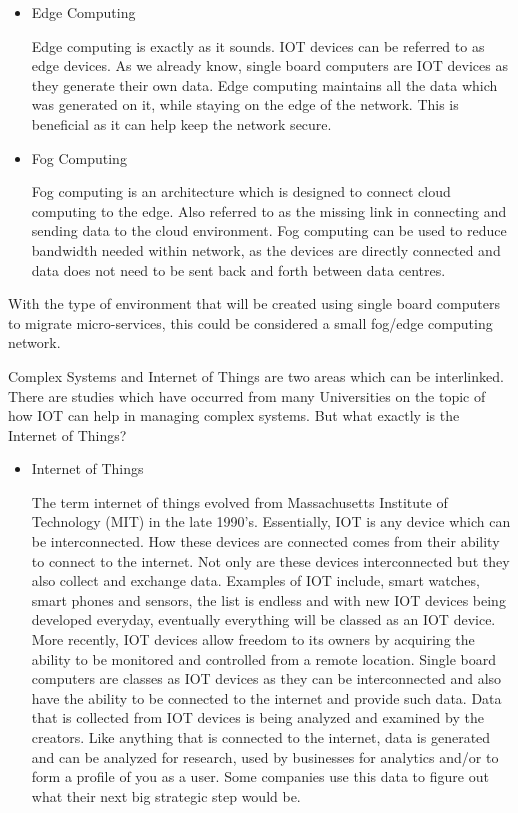 \begin{itemize}
    \item Edge Computing
    
    Edge computing is exactly as it sounds. IOT devices can be referred to as edge devices. As we already know, single board computers are IOT devices as they generate their own data. Edge computing maintains all the data which was generated on it, while staying on the edge of the network. This is beneficial as it can help keep the network secure. 
    
    \item Fog Computing
    
    Fog computing is an architecture which is designed to connect cloud computing to the edge. Also referred to as the missing link in connecting and sending data to the cloud environment. Fog computing can be used to reduce bandwidth needed within network, as the devices are directly connected and data does not need to be sent back and forth between data centres. 
    
    
\end{itemize}

With the type of environment that will be created using single board computers to migrate micro-services, this could be considered a small fog/edge computing network. 

Complex Systems and Internet of Things are two areas which can be interlinked. There are studies which have occurred from many Universities on the topic of how IOT can help in managing complex systems. But what exactly is the Internet of Things? 

\begin{itemize}
    \item Internet of Things 
    
    The term internet of things evolved from Massachusetts Institute of Technology (MIT) in the late 1990's. Essentially, IOT is any device which can be interconnected. How these devices are connected comes from their ability to connect to the internet. Not only are these devices interconnected but they also collect and exchange data. Examples of IOT include, smart watches, smart phones and sensors, the list is endless and with new IOT devices being developed everyday, eventually everything will be classed as an IOT device. More recently, IOT devices allow freedom to its owners by acquiring the ability to be monitored and controlled from a remote location. Single board computers are classes as IOT devices as they can be interconnected and also have the ability to be connected to the internet and provide such data. 
    Data that is collected from IOT devices is being analyzed and examined by the creators. Like anything that is connected to the internet, data is generated and can be analyzed for research, used by businesses for analytics and/or to form a profile of you as a user. Some companies use this data to figure out what their next big strategic step would be.
\end{itemize}



